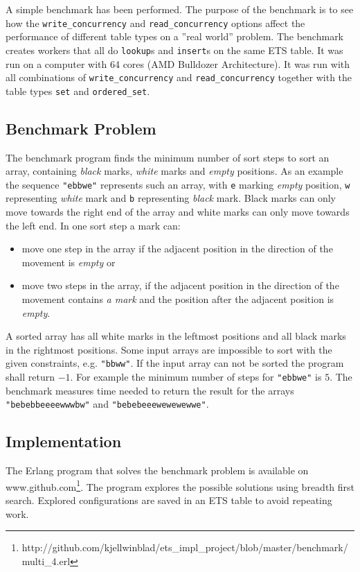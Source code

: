 \documentclass[aps,pre,preprint,nofootinbib]{revtex4}
\begin{document}
  A simple benchmark has been performed.
  The purpose of the benchmark is to see how the \verb|write_concurrency| and \verb|read_concurrency| options affect the performance of different table types on a ''real world'' problem.
  The benchmark creates workers that all do \verb|lookup|s and \verb|insert|s on the same ETS table.
  It was run on a computer with 64 cores (AMD Bulldozer Architecture).
  It was run with all combinations of \verb|write_concurrency| and \verb|read_concurrency| together with the table types \verb|set| and \verb|ordered_set|.
  
  \subsection{Benchmark Problem}
    The benchmark program finds the minimum number of sort steps to sort an array, containing \emph{black} marks, \emph{white} marks and \emph{empty} positions.
    As an example the sequence \verb|"ebbwe"| represents such an array, with \verb|e| marking \emph{empty} position, \verb|w| representing \emph{white} mark and \verb|b| representing \emph{black} mark.
    Black marks can only move towards the right end of the array and white marks can only move towards the left end.
    In one sort step a mark can:
    \begin{itemize}
     \item move one step in the array if the adjacent position in the direction of the movement is \emph{empty} or
     \item move two steps in the array, if the adjacent position in the direction of the movement contains \emph{a mark} and the position after the adjacent position is \emph{empty}.
    \end{itemize}
    A sorted array has all white marks in the leftmost positions and all black marks in the rightmost positions.
    Some input arrays are impossible to sort with the given constraints, e.g. \verb|"bbww"|.
    If the input array can not be sorted the program shall return $-1$.
    For example the minimum number of steps for \verb|"ebbwe"| is $5$.
    The benchmark measures time needed to return the result for the arrays \verb|"bebebbeeeewwwbw"| and \verb|"bebebeeewewewewwe"|.
    
  \subsection{Implementation}
    The Erlang program that solves the benchmark problem is available on www.github.com\footnote{http://github.com/kjellwinblad/ets\_impl\_project/blob/master/benchmark/multi\_4.erl}.
    The program explores the possible solutions using breadth first search.
    Explored configurations are saved in an ETS table to avoid repeating work.
    
\end{document}
